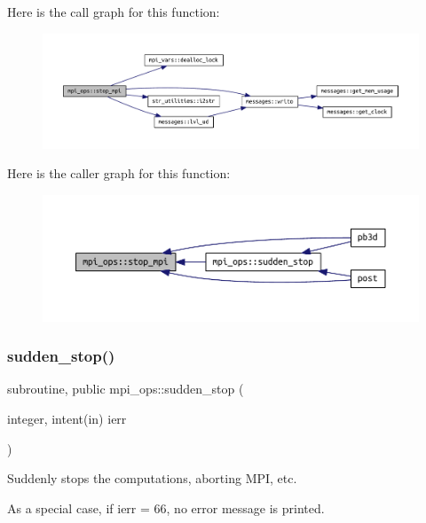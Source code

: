 Here is the call graph for this function\+:\nopagebreak
\begin{figure}[H]
\begin{center}
\leavevmode
\includegraphics[width=350pt]{namespacempi__ops_a9dcb5624e665c9e15a4203edb5f44b0f_cgraph}
\end{center}
\end{figure}
Here is the caller graph for this function\+:\nopagebreak
\begin{figure}[H]
\begin{center}
\leavevmode
\includegraphics[width=350pt]{namespacempi__ops_a9dcb5624e665c9e15a4203edb5f44b0f_icgraph}
\end{center}
\end{figure}
\mbox{\label{namespacempi__ops_a40e8610357a9a5b075fef9dab1c3f24f}} 
\subsubsection{\texorpdfstring{sudden\+\_\+stop()}{sudden\_stop()}}
{\footnotesize\ttfamily subroutine, public mpi\+\_\+ops\+::sudden\+\_\+stop (\begin{DoxyParamCaption}\item[{integer, intent(in)}]{ierr }\end{DoxyParamCaption})}



Suddenly stops the computations, aborting M\+PI, etc. 

As a special case, if {\ttfamily ierr} = 66, no error message is printed.

